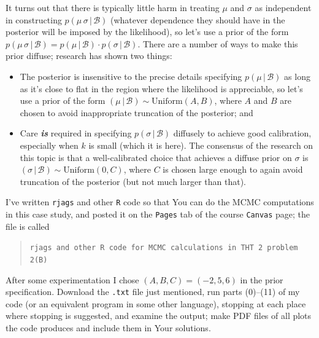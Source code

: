 \documentclass[12pt]{article}
\newcommand{\given}{\, | \,}
\newcommand{\bi}[1]{\textbf{\textit{#1}}}
\begin{document}
It turns out that there is typically little harm in treating $\mu$ and $\sigma$ as independent in constructing $p ( \mu \, \sigma \given \mathcal{ B } )$ (whatever dependence they should have in the posterior will be imposed by the likelihood), so let's use a prior of the form $p ( \mu \, \sigma \given \mathcal{ B } ) = p ( \mu \given \mathcal{ B } ) \cdot p ( \sigma \given \mathcal{ B } )$. There are a number of ways to make this prior diffuse; research has shown two things: 

\begin{itemize}

\item

The posterior is insensitive to the precise details specifying $p ( \mu \given \mathcal{ B } )$ as long as it's close to flat in the region where the likelihood is appreciable, so let's use a prior of the form $( \mu \given \mathcal{ B } ) \sim \textrm{Uniform} ( A, B )$, where $A$ and $B$ are chosen to avoid inappropriate truncation of the posterior; and

\item

Care \bi{is} required in specifying $p ( \sigma \given \mathcal{ B } )$ diffusely to achieve good calibration, especially when $k$ is small (which it is here). The consensus of the research on this topic is that a well-calibrated choice that achieves a diffuse prior on $\sigma$ is $( \sigma \given \mathcal{ B } ) \sim \textrm{Uniform} ( 0, C )$, where $C$ is chosen large enough to again avoid truncation of the posterior (but not much larger than that). 

\end{itemize}

I've written \texttt{rjags} and other \texttt{R} code so that You can do the MCMC computations in this case study, and posted it on the \texttt{Pages} tab of the course \texttt{Canvas} page; the file is called
\begin{quote}

\texttt{rjags and other R code for MCMC calculations in THT 2 problem 2(B)}

\end{quote}
After some experimentation I chose $( A, B, C ) = ( -2, 5, 6 )$ in the prior specification. Download the \texttt{.txt} file just mentioned, run parts (0)--(11) of my code (or an equivalent program in some other language), stopping at each place where stopping is suggested, and examine the output; make PDF files of all plots the code produces and include them in Your solutions.
\end{document}
